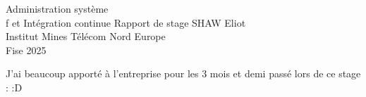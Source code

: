 \documentclass[a4paper,12pt]{report}
\begin{document}
\imtnepagedegarde
    {Administration système\\\hphantom f \qquad et Intégration continue} %
    {Rapport de stage} %
    {SHAW Eliot\\Institut Mines Télécom Nord Europe\\\vspace{5px}Fise 2025} %

\cleardoublepage


\clearpage

\tableofcontents
\clearpage




\clearpage







\clearpage






J'ai beaucoup apporté à l'entreprise pour les 3 mois et demi passé lors de ce stage :
:D

\cleardoublepage


\end{document}
